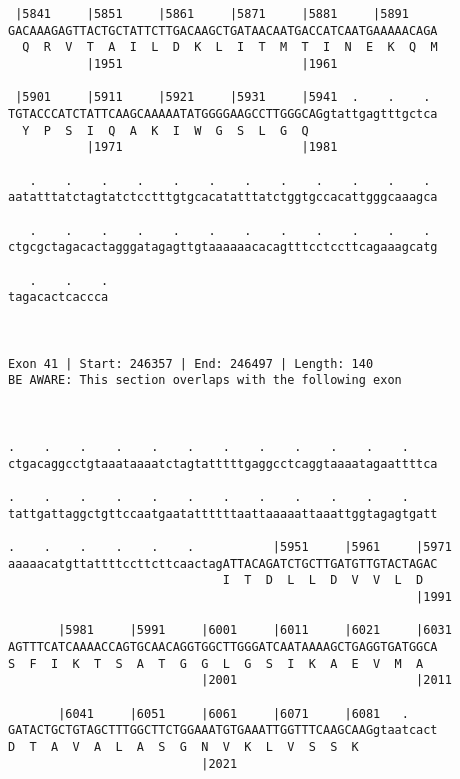 \documentclass{article}
\begin{document}
\begin{Verbatim}
 |5841     |5851     |5861     |5871     |5881     |5891    
GACAAAGAGTTACTGCTATTCTTGACAAGCTGATAACAATGACCATCAATGAAAAACAGA
  Q  R  V  T  A  I  L  D  K  L  I  T  M  T  I  N  E  K  Q  M
           |1951                         |1961              
  
 |5901     |5911     |5921     |5931     |5941  .    .    . 
TGTACCCATCTATTCAAGCAAAAATATGGGGAAGCCTTGGGCAGgtattgagtttgctca
  Y  P  S  I  Q  A  K  I  W  G  S  L  G  Q                  
           |1971                         |1981              
  
   .    .    .    .    .    .    .    .    .    .    .    . 
aatatttatctagtatctcctttgtgcacatatttatctggtgccacattgggcaaagca
                                                            
   .    .    .    .    .    .    .    .    .    .    .    . 
ctgcgctagacactagggatagagttgtaaaaaacacagtttcctccttcagaaagcatg
                                                            
   .    .    .
tagacactcaccca
              
              
 
Exon 41 | Start: 246357 | End: 246497 | Length: 140
BE AWARE: This section overlaps with the following exon



.    .    .    .    .    .    .    .    .    .    .    .    
ctgacaggcctgtaaataaaatctagtatttttgaggcctcaggtaaaatagaattttca
                                                            
.    .    .    .    .    .    .    .    .    .    .    .    
tattgattaggctgttccaatgaatattttttaattaaaaattaaattggtagagtgatt
                                                            
.    .    .    .    .    .           |5951     |5961     |5971
aaaaacatgttattttccttcttcaactagATTACAGATCTGCTTGATGTTGTACTAGAC
                              I  T  D  L  L  D  V  V  L  D  
                                                         |1991
  
       |5981     |5991     |6001     |6011     |6021     |6031
AGTTTCATCAAAACCAGTGCAACAGGTGGCTTGGGATCAATAAAAGCTGAGGTGATGGCA
S  F  I  K  T  S  A  T  G  G  L  G  S  I  K  A  E  V  M  A  
                           |2001                         |2011
  
       |6041     |6051     |6061     |6071     |6081   .    
GATACTGCTGTAGCTTTGGCTTCTGGAAATGTGAAATTGGTTTCAAGCAAGgtaatcact
D  T  A  V  A  L  A  S  G  N  V  K  L  V  S  S  K           
                           |2021                            
  

\end{Verbatim}
\end{document}
